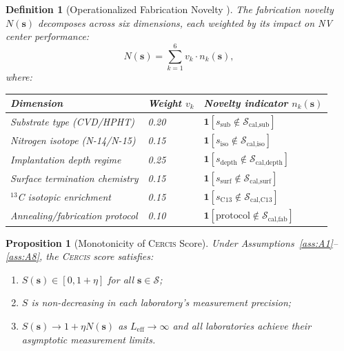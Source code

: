 \documentclass[11pt,a4paper]{article}
\newcommand{\eff}{\mathrm{eff}}
\newtheorem{proposition}[theorem]{Proposition}
\newtheorem{definition}[theorem]{Definition}
\theoremstyle{definition}
\newcommand{\Cercis}{\textsc{Cercis}}
\newcommand{\ind}[1]{\mathbf{1}[#1]}
\newcommand{\cS}{\mathcal{S}}
\newcommand{\NV}{NV}
\begin{document}
\begin{definition}[Operationalized Fabrication Novelty ]
\label{def:N_operational}
The fabrication novelty $N(\mathbf{s})$ decomposes across six dimensions,
each weighted by its impact on \NV{} center performance:
\begin{equation}
    N(\mathbf{s}) = \sum_{k=1}^{6} v_k \cdot n_k(\mathbf{s}),
    \label{eq:N_full}
\end{equation}
where:
\begin{center}
\begin{tabular}{lll}
\toprule
\textbf{Dimension} & \textbf{Weight $v_k$} & \textbf{Novelty indicator $n_k(\mathbf{s})$} \\
\midrule
Substrate type (CVD/HPHT) & 0.20 & $\ind{s_{\text{sub}} \notin \cS_{\text{cal}, \text{sub}}}$ \\
Nitrogen isotope (N-14/N-15) & 0.15 & $\ind{s_{\text{iso}} \notin \cS_{\text{cal}, \text{iso}}}$ \\
Implantation depth regime & 0.25 & $\ind{s_{\text{depth}} \notin \cS_{\text{cal}, \text{depth}}}$ \\
Surface termination chemistry & 0.15 & $\ind{s_{\text{surf}} \notin \cS_{\text{cal}, \text{surf}}}$ \\
${}^{13}$C isotopic enrichment & 0.15 & $\ind{s_{\text{C13}} \notin \cS_{\text{cal}, \text{C13}}}$ \\
Annealing/fabrication protocol & 0.10 & $\ind{\text{protocol} \notin \cS_{\text{cal}, \text{fab}}}$ \\
\bottomrule
\end{tabular}
\end{center}
\end{definition}

\begin{proposition}[Monotonicity of \Cercis{} Score]
\label{prop:cercis_monotone}
Under Assumptions~\ref{ass:A1}--\ref{ass:A8}, the \Cercis{} score satisfies:
\begin{enumerate}[label=(\roman*), nosep]
    \item $S(\mathbf{s}) \in [0, 1 + \eta]$ for all $\mathbf{s} \in \cS$;
    \item $S$ is non-decreasing in each laboratory's measurement precision;
    \item $S(\mathbf{s}) \to 1 + \eta N(\mathbf{s})$ as $L_{\eff} \to \infty$
    and all laboratories achieve their asymptotic measurement limits.
\end{enumerate}
\end{proposition}
\end{document}
